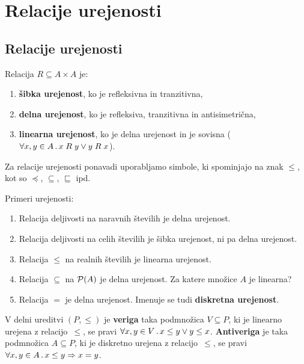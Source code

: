 \chapter{Relacije urejenosti}

\section{Relacije urejenosti}
\begin{definicija}
  Relacija $R \subseteq A \times A$ je:
  \begin{enumerate}
  \item \textbf{šibka urejenost}, ko je refleksivna in tranzitivna,
  \item \textbf{delna urejenost}, ko je refleksiva, tranzitivna in antisimetrična,
  \item \textbf{linearna urejenost}, ko je delna urejenost in je sovisna ($\forall x, y \in A \,.\, x \mathrel{R} y \lor y \mathrel{R} x$).
  \end{enumerate}
\end{definicija}

Za relacije urejenosti ponavadi uporabljamo simbole, ki spominjajo na znak $\leq$, kot so $\preceq$, $\subseteq$, $\sqsubseteq$ ipd.

\begin{primer}
  Primeri urejenosti:
  \begin{enumerate}
    \item Relacija deljivosti na naravnih številih je delna urejenost.
    \item Relacija deljivosti na celih številih je šibka urejenost, ni pa delna urejenost.
    \item Relacija $\leq$ na realnih številih je linearna urejenost.
    \item Relacija $\subseteq$ na $\mathcal{P}(A)$ je delna urejenost. Za katere množice $A$ je linearna?
    \item Relacija $=$ je delna urejenost. Imenuje se tudi \textbf{diskretna urejenost}.
  \end{enumerate}
\end{primer}


\begin{definicija}
  V delni ureditvi $(P, {\leq})$ je \textbf{veriga} taka podmnožica $V \subseteq P$, ki je linearno urejena z relacijo~$\leq$, se pravi $\forall x, y \in V \,.\, x \leq y \lor y \leq x$. \textbf{Antiveriga} je taka podmnožica $A \subseteq P$, ki je diskretno urejena z relacijo~$\leq$, se pravi $\forall x, y \in A \,.\, x \leq y \Rightarrow x = y$.
\end{definicija}

